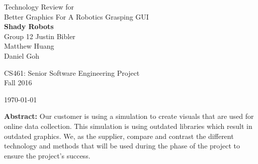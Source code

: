 \documentclass[10pt,journal,compsoc,draftclsnofoot]{IEEEtran}
\begin{document}
\onecolumn

\begin{titlepage}
\null
\vspace{20mm}

\begin{flushleft}
\begin{bfseries}
	\vskip2mm
	\Huge{Technology Review for\\ Better Graphics For A Robotics Grasping GUI}\\
	\vspace{30mm}
	\textbf{\huge Shady Robots} \\
	\vskip2mm
	\large{Group 12}
	\vskip5mm
	\Large{Justin Bibler \\
	Matthew Huang \\
	Daniel Goh \\}
\end{bfseries}

\vspace{15mm}
\Large{CS461: Senior Software Engineering Project} \\
\Large{Fall 2016} \\

\vspace{10mm}

\today

\vfill

\begin{normalsize}
{\bf Abstract:}
Our customer is using a simulation to create visuals that are used for online data collection.
This simulation is using outdated libraries which result in outdated graphics.
We, as the supplier, compare and contrast the different technology and methods that will be used during the phase of the project to ensure the project's success.
\end{normalsize}
\end{flushleft}

\end{titlepage}
\end{document}
